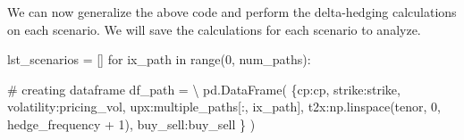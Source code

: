 \documentclass[
  letterpaper,
  DIV=11,
  numbers=noendperiod]{scrreprt}
\newenvironment{Shaded}{\begin{snugshade}}{\end{snugshade}}
\newcommand{\BuiltInTok}[1]{\textcolor[rgb]{0.00,0.23,0.31}{#1}}
\newcommand{\CommentTok}[1]{\textcolor[rgb]{0.37,0.37,0.37}{#1}}
\newcommand{\ControlFlowTok}[1]{\textcolor[rgb]{0.00,0.23,0.31}{#1}}
\newcommand{\DecValTok}[1]{\textcolor[rgb]{0.68,0.00,0.00}{#1}}
\newcommand{\KeywordTok}[1]{\textcolor[rgb]{0.00,0.23,0.31}{#1}}
\newcommand{\NormalTok}[1]{\textcolor[rgb]{0.00,0.23,0.31}{#1}}
\newcommand{\OperatorTok}[1]{\textcolor[rgb]{0.37,0.37,0.37}{#1}}
\newcommand{\StringTok}[1]{\textcolor[rgb]{0.13,0.47,0.30}{#1}}
\begin{document}
We can now generalize the above code and perform the delta-hedging
calculations on each scenario. We will save the calculations for each
scenario to analyze.

\begin{Shaded}
\begin{Highlighting}[]
\NormalTok{lst\_scenarios }\OperatorTok{=}\NormalTok{ []}
\ControlFlowTok{for}\NormalTok{ ix\_path }\KeywordTok{in} \BuiltInTok{range}\NormalTok{(}\DecValTok{0}\NormalTok{, num\_paths):}
    
    \CommentTok{\# creating dataframe}
\NormalTok{    df\_path }\OperatorTok{=} \OperatorTok{\textbackslash{}}
\NormalTok{        pd.DataFrame(}
\NormalTok{            \{}\StringTok{\textquotesingle{}cp\textquotesingle{}}\NormalTok{:cp,}
             \StringTok{\textquotesingle{}strike\textquotesingle{}}\NormalTok{:strike,}
             \StringTok{\textquotesingle{}volatility\textquotesingle{}}\NormalTok{:pricing\_vol,}
             \StringTok{\textquotesingle{}upx\textquotesingle{}}\NormalTok{:multiple\_paths[:, ix\_path], }
             \StringTok{\textquotesingle{}t2x\textquotesingle{}}\NormalTok{:np.linspace(tenor, }\DecValTok{0}\NormalTok{, hedge\_frequency }\OperatorTok{+} \DecValTok{1}\NormalTok{),}
             \StringTok{\textquotesingle{}buy\_sell\textquotesingle{}}\NormalTok{:buy\_sell}
\NormalTok{            \}}
\NormalTok{        )}
    

\end{Highlighting}
\end{Shaded}
\end{document}
